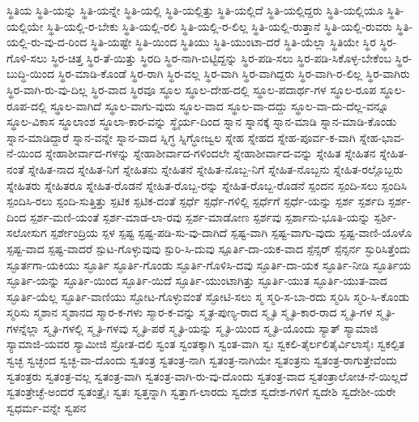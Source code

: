{ಸ್ಥಿತಿಯ
ಸ್ಥಿತಿ-ಯನ್ನು
ಸ್ಥಿತಿ-ಯನ್ನೇ
ಸ್ಥಿತಿ-ಯಲ್ಲಿ
ಸ್ಥಿತಿ-ಯಲ್ಲಿತ್ತು
ಸ್ಥಿತಿ-ಯಲ್ಲಿದೆ
ಸ್ಥಿತಿ-ಯಲ್ಲಿದ್ದರು
ಸ್ಥಿತಿ-ಯಲ್ಲಿಯೂ
ಸ್ಥಿತಿ-ಯಲ್ಲಿಯೇ
ಸ್ಥಿತಿ-ಯಲ್ಲಿ-ರ-ಬೇಕು
ಸ್ಥಿತಿ-ಯಲ್ಲಿ-ರಲಿ
ಸ್ಥಿತಿ-ಯಲ್ಲಿ-ರ-ಲಿಲ್ಲ
ಸ್ಥಿತಿ-ಯಲ್ಲಿ-ರುತ್ತಾನೆ
ಸ್ಥಿತಿ-ಯಲ್ಲಿ-ರುವರು
ಸ್ಥಿತಿ-ಯಲ್ಲಿ-ರು-ವು-ದ-ರಿಂದ
ಸ್ಥಿತಿ-ಯಷ್ಟೇ
ಸ್ಥಿತಿ-ಯಿಂದ
ಸ್ಥಿತಿಯು
ಸ್ಥಿತಿ-ಯುಂಟಾ-ದರೆ
ಸ್ಥಿತಿ-ಯೆಲ್ಲಾ
ಸ್ಥಿತಿಯೇ
ಸ್ಥಿರ
ಸ್ಥಿರ-ಗೊಳಿ-ಸಲು
ಸ್ಥಿರ-ಚಿತ್ತ
ಸ್ಥಿರ-ತೆ-ಯಿತ್ತು
ಸ್ಥಿರದಿ
ಸ್ಥಿರ-ನಾಗಿ-ಬಿಟ್ಟಿದ್ದನ್ನು
ಸ್ಥಿರ-ಪಡಿ-ಸಲು
ಸ್ಥಿರ-ಪಡಿ-ಸಿಕೊಳ್ಳ-ಬೇಕೆಂಬ
ಸ್ಥಿರ-ಬುದ್ಧಿ-ಯಿಂದ
ಸ್ಥಿರ-ಮಾಡಿ-ಕೊಂಡೆ
ಸ್ಥಿರ-ರಾಗಿ
ಸ್ಥಿರ-ವಲ್ಲ
ಸ್ಥಿರ-ವಾಗಿ
ಸ್ಥಿರ-ವಾಗಿದ್ದರು
ಸ್ಥಿರ-ವಾಗಿ-ರ-ಲಿಲ್ಲ
ಸ್ಥಿರ-ವಾಗಿರು
ಸ್ಥಿರ-ವಾಗಿ-ರು-ವು-ದಿಲ್ಲ
ಸ್ಥಿರ-ವಾದ
ಸ್ಥಿರವೂ
ಸ್ಥೂಲ
ಸ್ಥೂಲ-ದೇಹ-ದಲ್ಲಿ
ಸ್ಥೂಲ-ಪದಾರ್ಥ-ಗಳ
ಸ್ಥೂಲ-ರೂಪ
ಸ್ಥೂಲ-ರೂಪ-ದಲ್ಲಿ
ಸ್ಥೂಲ-ವಾಗಿದೆ
ಸ್ಥೂಲ-ವಾಗು-ವುದು
ಸ್ಥೂಲ-ವಾದ
ಸ್ಥೂಲ-ವಾ-ದದ್ದು
ಸ್ಥೂಲ-ವಾ-ದು-ದೆಲ್ಲ-ವನ್ನೂ
ಸ್ಥೂಲ-ವಿಕಾಸ
ಸ್ಥೂಲಾಂಶ
ಸ್ಥೂಲಾ-ಕಾರ-ವನ್ನು
ಸ್ಥೈರ್ಯ-ದಿಂದ
ಸ್ನಾನ
ಸ್ನಾನಕ್ಕೆ
ಸ್ನಾನ-ಮಾಡಿ
ಸ್ನಾನ-ಮಾಡಿ-ಕೊಂಡು
ಸ್ನಾನ-ಮಾಡಿದ್ದಾರೆ
ಸ್ನಾನ-ವನ್ನೇ
ಸ್ನಾನ-ವಾದ
ಸ್ನಿಗ್ಧ
ಸ್ನಿಗ್ಧೋಜ್ವಲ
ಸ್ನೇಹ
ಸ್ನೇಹದ
ಸ್ನೇಹ-ಪೂರ್ವ-ಕ-ವಾಗಿ
ಸ್ನೇಹ-ಭಾವ-ನೆ-ಯಿಂದ
ಸ್ನೇಹಾಶೀರ್ವಾದ-ಗಳನ್ನು
ಸ್ನೇಹಾಶೀರ್ವಾದ-ಗಳಿಂದಲೇ
ಸ್ನೇಹಾಶೀರ್ವಾದ-ವನ್ನು
ಸ್ನೇಹಿತ
ಸ್ನೇಹಿತನ
ಸ್ನೇಹಿತ-ನಂತೆ
ಸ್ನೇಹಿತ-ನಾದ
ಸ್ನೇಹಿತ-ನಿಗೆ
ಸ್ನೇಹಿತನು
ಸ್ನೇಹಿತನೆ
ಸ್ನೇಹಿತ-ನೊಬ್ಬ-ನಿಗೆ
ಸ್ನೇಹಿತ-ನೊಬ್ಬನು
ಸ್ನೇಹಿತ-ರಲ್ಲೊಬ್ಬರು
ಸ್ನೇಹಿತರು
ಸ್ನೇಹಿತರೂ
ಸ್ನೇಹಿತ-ರೊಡನೆ
ಸ್ನೇಹಿತ-ರೊಬ್ಬ-ರನ್ನು
ಸ್ನೇಹಿತ-ರೊಬ್ಬ-ರೊಡನೆ
ಸ್ಪಂದನ
ಸ್ಪಂದಿ-ಸಲು
ಸ್ಪಂದಿಸಿ
ಸ್ಪಂದಿಸಿ-ರಲು
ಸ್ಪಂದಿ-ಸುತ್ತಿತ್ತು
ಸ್ಪಟಿಕ
ಸ್ಪಟಿಕ-ದಂತೆ
ಸ್ಪರ್ಧೆ
ಸ್ಪರ್ಧೆ-ಗಳಿಲ್ಲಿ
ಸ್ಪರ್ಧೆಗೆ
ಸ್ಪರ್ಧೆ-ಯನ್ನು
ಸ್ಪರ್ಶ
ಸ್ಪರ್ಶದಿ
ಸ್ಪರ್ಶ-ದಿಂದ
ಸ್ಪರ್ಶ-ಮಣಿ-ಯಂತೆ
ಸ್ಪರ್ಶ-ಮಾಡ-ಲಾ-ರವು
ಸ್ಪರ್ಶ-ಮಾಡೋಣ
ಸ್ಪರ್ಶವು
ಸ್ಪರ್ಶಾನು-ಭೂತಿ-ಯನ್ನು
ಸ್ಪರ್ಶಿ-ಸಲೋಸುಗ
ಸ್ಪರ್ಶೇಂದ್ರಿಯ
ಸ್ಪಳ
ಸ್ಪಷ್ಟ
ಸ್ಪಷ್ಟ-ಪಡಿ-ಸು-ವು-ದಾಗಿದೆ
ಸ್ಪಷ್ಟ-ವಾಗಿ
ಸ್ಪಷ್ಟ-ವಾಗು-ವುದು
ಸ್ಪಷ್ಟ-ವಾಣಿ-ಯೊಳೊ
ಸ್ಪಷ್ಟ-ವಾದ
ಸ್ಪಷ್ಟ-ವಾದರೆ
ಸ್ಪುಟ-ಗೊಳ್ಳುವುವು
ಸ್ಪುರಿ-ಸಿ-ದುವು
ಸ್ಪೂರ್ತಿ-ದಾ-ಯಕ-ವಾದ
ಸ್ಪೆನ್ಸರ್
ಸ್ಪೆನ್ಸರ್ನ
ಸ್ಫುರಿಸಿತ್ತೆಂದು
ಸ್ಫೂರ್ತಗಾ-ಯಕಿಯು
ಸ್ಫೂರ್ತಿ
ಸ್ಫೂರ್ತಿ-ಗೊಂಡು
ಸ್ಫೂರ್ತಿ-ಗೊಳಿಸಿ-ದವು
ಸ್ಫೂರ್ತಿ-ದಾ-ಯಕ
ಸ್ಫೂರ್ತಿ-ನೀಡಿ
ಸ್ಫೂರ್ತಿಯ
ಸ್ಫೂರ್ತಿ-ಯನ್ನು
ಸ್ಫೂರ್ತಿ-ಯಿಂದ
ಸ್ಫೂರ್ತಿ-ಯಿದೆ
ಸ್ಫೂರ್ತಿ-ಯುಂಟಾಗಿತ್ತು
ಸ್ಫೂರ್ತಿ-ಯುತ
ಸ್ಫೂರ್ತಿ-ಯುತ-ವಾದ
ಸ್ಫೂರ್ತಿ-ಯೆಲ್ಲ
ಸ್ಫೂರ್ತಿ-ವಾಣಿಯು
ಸ್ಫೋಟ-ಗೊಳ್ಳುವಂತೆ
ಸ್ಫೋಟಿ-ಸಲು
ಸ್ಮ
ಸ್ಮರಿ-ಸ-ಬಾ-ರದು
ಸ್ಮರಿಸಿ
ಸ್ಮರಿ-ಸಿ-ಕೊಂಡು
ಸ್ಮರಿಸು
ಸ್ಮಶಾನ
ಸ್ಮಶಾನದ
ಸ್ಮಾರ-ಕ-ಗಳು
ಸ್ಮಾರ-ಕ-ವನ್ನು
ಸ್ಮೃತ-ಪುಣ್ಯ-ರಾದ
ಸ್ಮೃತಿ
ಸ್ಮೃತಿ-ಕಾರ-ರಾದ
ಸ್ಮೃತಿ-ಗಳ
ಸ್ಮೃತಿ-ಗಳನ್ನೆಲ್ಲಾ
ಸ್ಮೃತಿ-ಗಳಲ್ಲಿ
ಸ್ಮೃತಿ-ಗಳವು
ಸ್ಮೃತಿ-ಪಠೆ
ಸ್ಮೃತಿ-ಯನ್ನು
ಸ್ಮೃತಿ-ಯಿಂದ
ಸ್ಮೃತಿ-ಯೊಂದು
ಸ್ಯಾತ್
ಸ್ಯಾಮಾಜಿ
ಸ್ಯಾಮಾಜಿ-ಯವರ
ಸ್ಯಾಮೀಜಿ
ಸ್ರೋತ-ದಲಿ
ಸ್ವಂತ
ಸ್ವಂತಕ್ಕಾಗಿ
ಸ್ವಂತ-ವಾಗಿ
ಸ್ವಃ
ಸ್ವಕಲಿ-ತೈರ್ಲಲಿತೈರ್ವಿಲಾಸೈಃ
ಸ್ವಕಲ್ಪಿತ
ಸ್ವಚ್ಛ
ಸ್ವಚ್ಛಂದ
ಸ್ವಚ್ಛ-ವಾ-ದೊಂದು
ಸ್ವತಂತ್ರ
ಸ್ವತಂತ್ರ-ನಾಗಿ
ಸ್ವತಂತ್ರ-ನಾಗಿಯೇ
ಸ್ವತಂತ್ರನು
ಸ್ವತಂತ್ರ-ರಾಗುತ್ತೇವೆಂದು
ಸ್ವತಂತ್ರರು
ಸ್ವತಂತ್ರ-ವಲ್ಲ
ಸ್ವತಂತ್ರ-ವಾಗಿ
ಸ್ವತಂತ್ರ-ವಾಗಿ-ರು-ವು-ದೊಂದು
ಸ್ವತಂತ್ರ-ವಾದ
ಸ್ವತಂತ್ರಾಲೋಚ-ನೆ-ಯಿಲ್ಲದೆ
ಸ್ವತಂತ್ರೇಚ್ಛೆ-ಅಂದರೆ
ಸ್ವತಂತ್ರೈಃ
ಸ್ವತಃ
ಸ್ವತ್ತನ್ನಾಗಿ
ಸ್ವತ್ತಾಗ-ಲಾರದು
ಸ್ವದೇಶ
ಸ್ವದೇಶ-ಗಳಿಗೆ
ಸ್ವದೇಶಿ
ಸ್ವದೇಶೀ-ಯರೇ
ಸ್ವಧರ್ಮ-ವನ್ನೇ
ಸ್ವಪನ
}
